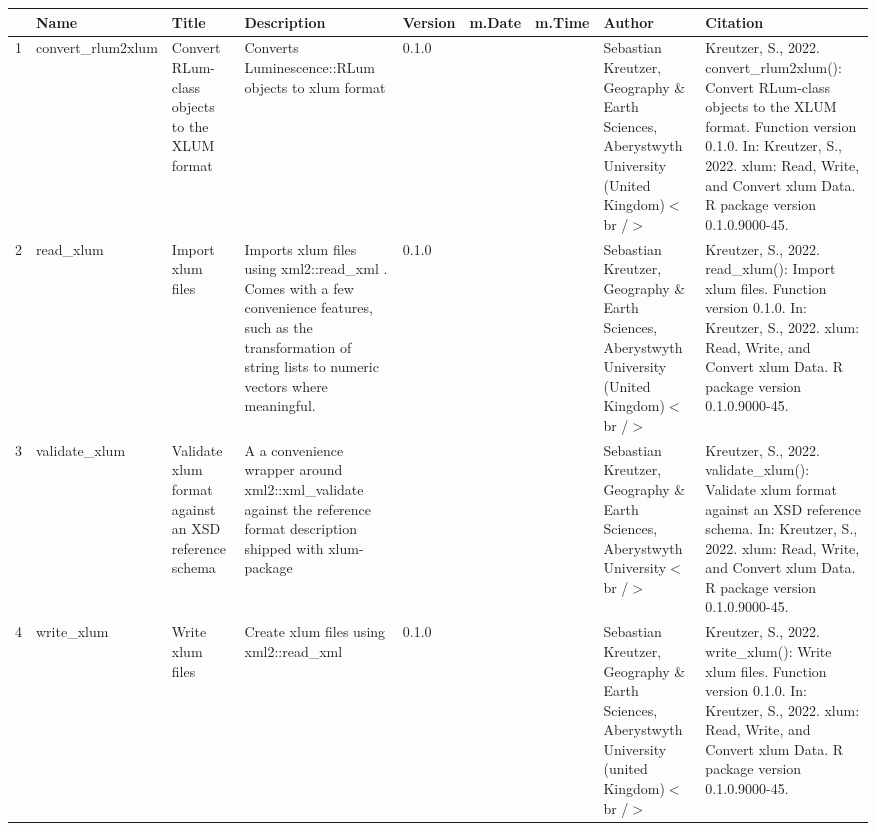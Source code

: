 \begin{table}[ht]
\centering
\begin{tabular}{rllllllll}
  \hline
 & Name & Title & Description & Version & m.Date & m.Time & Author & Citation \\ 
  \hline
1 & convert\_rlum2xlum & Convert RLum-class objects to the XLUM format & Converts  Luminescence::RLum  objects to xlum format & 0.1.0
 &  &  & Sebastian Kreutzer, Geography \& Earth Sciences, Aberystwyth University (United Kingdom)$<$br /$>$ & Kreutzer, S., 2022. convert\_rlum2xlum(): Convert RLum-class objects to the XLUM format. Function version 0.1.0. In: Kreutzer, S., 2022. xlum: Read, Write, and Convert xlum Data. R package version 0.1.0.9000-45. 
 \\ 
  2 & read\_xlum & Import xlum files & Imports xlum files using  xml2::read\_xml . Comes with a few convenience features, such as the transformation of string lists to numeric vectors where meaningful. & 0.1.0
 &  &  & Sebastian Kreutzer, Geography \& Earth Sciences, Aberystwyth University (United Kingdom)$<$br /$>$ & Kreutzer, S., 2022. read\_xlum(): Import xlum files. Function version 0.1.0. In: Kreutzer, S., 2022. xlum: Read, Write, and Convert xlum Data. R package version 0.1.0.9000-45. 
 \\ 
  3 & validate\_xlum & Validate xlum format against an XSD reference schema & A a convenience wrapper around  xml2::xml\_validate  against the reference format description shipped with  xlum-package &  &  &  & Sebastian Kreutzer, Geography \& Earth Sciences, Aberystwyth University$<$br /$>$ & Kreutzer, S., 2022. validate\_xlum(): Validate xlum format against an XSD reference schema. In: Kreutzer, S., 2022. xlum: Read, Write, and Convert xlum Data. R package version 0.1.0.9000-45. 
 \\ 
  4 & write\_xlum & Write xlum files & Create xlum files using  xml2::read\_xml & 0.1.0
 &  &  & Sebastian Kreutzer, Geography \& Earth Sciences, Aberystwyth University (united Kingdom)$<$br /$>$ & Kreutzer, S., 2022. write\_xlum(): Write xlum files. Function version 0.1.0. In: Kreutzer, S., 2022. xlum: Read, Write, and Convert xlum Data. R package version 0.1.0.9000-45. 
 \\ 
   \hline
\end{tabular}
\end{table}

